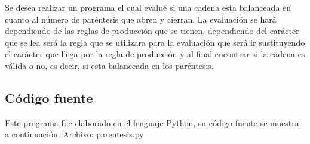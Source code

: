 \documentclass[12pt]{article}
\begin{document}
Se desea realizar un programa el cual evalué si una cadena esta balanceada en cuanto al número de paréntesis que abren y cierran. La evaluación se hará dependiendo de las reglas de producción que se tienen, dependiendo del carácter que se lea será la regla que se utilizara para la evaluación que será ir sustituyendo el carácter que llega por la regla de producción y al final encontrar si la cadena es válida o no, es decir, si esta balanceada en los paréntesis.

\subsection{Código fuente}
Este programa fue elaborado en el lenguaje Python, su código fuente se muestra a continuación:
Archivo: parentesis.py
\lstset{language=Python, breaklines=true, basicstyle=\footnotesize}
\end{document}

